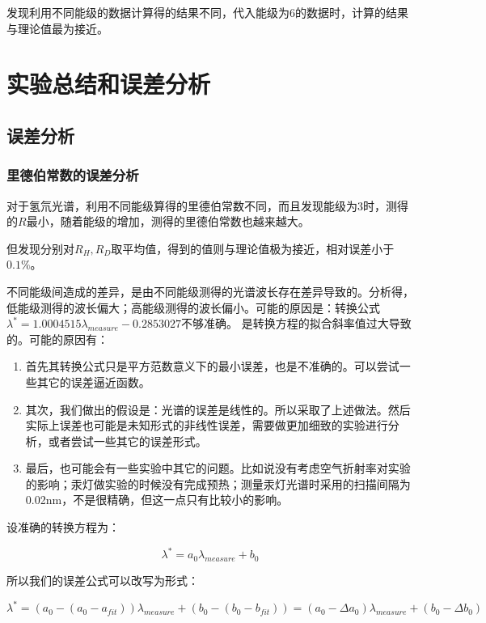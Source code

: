 \documentclass[a4paper,UTF8]{ctexart}
\begin{document}
发现利用不同能级的数据计算得的结果不同，代入能级为6的数据时，计算的结果与理论值最为接近。

\section{实验总结和误差分析}

\subsection{误差分析}

\subsubsection{里德伯常数的误差分析}

对于氢氘光谱，利用不同能级算得的里德伯常数不同，而且发现能级为3时，测得的$R$最小，随着能级的增加，测得的里德伯常数也越来越大。

但发现分别对$R_{H},R_{D}$取平均值，得到的值则与理论值极为接近，相对误差小于$0.1\%$。

不同能级间造成的差异，是由不同能级测得的光谱波长存在差异导致的。分析得，低能级测得的波长偏大；高能级测得的波长偏小。可能的原因是：转换公式
    $\lambda^{*} = 1.0004515 \lambda_{measure} - 0.2853027$不够准确。
是转换方程的拟合斜率值过大导致的。可能的原因有：

\begin{enumerate}
    \item 首先其转换公式只是平方范数意义下的最小误差，也是不准确的。可以尝试一些其它的误差逼近函数。
    \item 其次，我们做出的假设是：光谱的误差是线性的。所以采取了上述做法。然后实际上误差也可能是未知形式的非线性误差，需要做更加细致的实验进行分析，或者尝试一些其它的误差形式。
    \item 最后，也可能会有一些实验中其它的问题。比如说没有考虑空气折射率对实验的影响；汞灯做实验的时候没有完成预热；测量汞灯光谱时采用的扫描间隔为0.02nm，不是很精确，但这一点只有比较小的影响。
\end{enumerate}

设准确的转换方程为：

\begin{equation}
    \lambda ^* = a_0 \lambda_{measure} + b_0
\end{equation}

所以我们的误差公式可以改写为形式：

\begin{equation}
    \lambda^* = (a_0 - (a_0 - a_{fit})) \lambda_{measure} + (b_0 - (b_0 - b_{fit})) = (a_0 - \Delta a_0) \lambda_{measure} + (b_0 - \Delta b_0) 
\end{equation}
\end{document}
